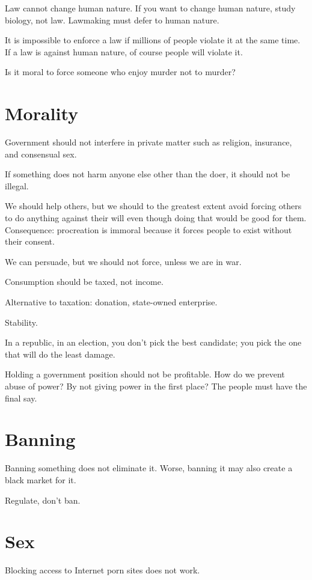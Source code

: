 Law cannot change human nature.
If you want to change human nature, study biology, not law.
Lawmaking must defer to human nature.

It is impossible to enforce a law if millions of people violate it at the same time.
If a law is against human nature, of course people will violate it.

Is it moral to force someone who enjoy murder not to murder?

\section{Morality}

Government should not interfere in private matter
such as religion, insurance, and consensual sex.

If something does not harm anyone else other than the doer,
it should not be illegal.

We should help others,
but we should to the greatest extent avoid forcing
others to do anything against their will
even though doing that would be good for them.
Consequence: procreation is immoral because
it forces people to exist without their consent.

We can persuade, but we should not force, unless we are in war.

Consumption should be taxed, not income.

Alternative to taxation: donation, state-owned enterprise.

Stability.

In a republic, in an election, you don't pick the best candidate;
you pick the one that will do the least damage.

Holding a government position should not be profitable.
How do we prevent abuse of power?
By not giving power in the first place?
The people must have the final say.

\section{Banning}

Banning something does not eliminate it.
Worse, banning it may also create a black market for it.

Regulate, don't ban.

\section{Sex}

Blocking access to Internet porn sites does not work.

